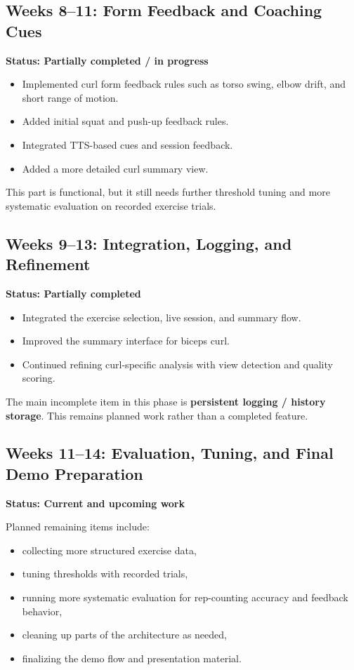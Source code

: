 \documentclass[12pt,a4paper]{article}
\begin{document}
\subsection{Weeks 8--11: Form Feedback and Coaching Cues}

\textbf{Status: Partially completed / in progress}

\begin{itemize}
    \item Implemented curl form feedback rules such as torso swing, elbow drift, and short range of motion.
    \item Added initial squat and push-up feedback rules.
    \item Integrated TTS-based cues and session feedback.
    \item Added a more detailed curl summary view.
\end{itemize}

This part is functional, but it still needs further threshold tuning and more systematic evaluation on recorded exercise trials.

\subsection{Weeks 9--13: Integration, Logging, and Refinement}

\textbf{Status: Partially completed}

\begin{itemize}
    \item Integrated the exercise selection, live session, and summary flow.
    \item Improved the summary interface for biceps curl.
    \item Continued refining curl-specific analysis with view detection and quality scoring.
\end{itemize}

The main incomplete item in this phase is \textbf{persistent logging / history storage}. This remains planned work rather than a completed feature.

\subsection{Weeks 11--14: Evaluation, Tuning, and Final Demo Preparation}

\textbf{Status: Current and upcoming work}

Planned remaining items include:

\begin{itemize}
    \item collecting more structured exercise data,
    \item tuning thresholds with recorded trials,
    \item running more systematic evaluation for rep-counting accuracy and feedback behavior,
    \item cleaning up parts of the architecture as needed,
    \item finalizing the demo flow and presentation material.
\end{itemize}
\end{document}
